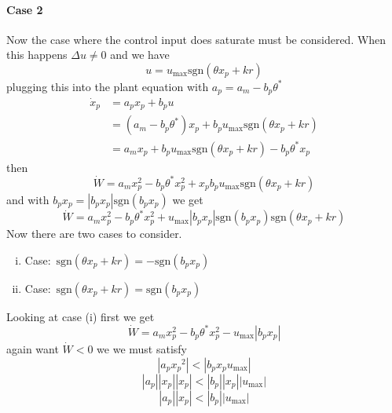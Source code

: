 \paragraph{Case 2} Now the case where the control input does saturate must be considered.
When this happens $\Delta u\neq 0$ and we have
\begin{equation*}
  u=u_{\text{max}}\text{sgn}(\theta x_{p}+kr)
\end{equation*}
plugging this into the plant equation with $a_{p}=a_{m}-b_{p}\theta^{*}$
\begin{equation*}
  \begin{split}
    \dot{x}_{p}&=a_{p}x_{p}+b_{p}u \\
    &=(a_{m}-b_{p}\theta^{*})x_{p}+b_{p}u_{\text{max}}\text{sgn}(\theta x_{p}+kr) \\
    &=a_{m}x_{p}+b_{p}u_{\text{max}}\text{sgn}(\theta x_{p}+kr)-b_{p}\theta^{*}x_{p}
  \end{split}
\end{equation*}
then
\begin{equation*}
  \dot{W}=a_{m}x_{p}^{2}-b_{p}\theta^{*}x_{p}^{2}+x_{p}b_{p}u_{\text{max}}\text{sgn}(\theta x_{p}+kr)
\end{equation*}
and with $b_{p}x_{p}=|b_{p}x_{p}|\text{sgn}(b_{p}x_{p})$ we get
\begin{equation*}
  \dot{W}=a_{m}x_{p}^{2}-b_{p}\theta^{*}x_{p}^{2}+u_{\text{max}}|b_{p}x_{p}|\text{sgn}(b_{p}x_{p})\text{sgn}(\theta x_{p}+kr)
\end{equation*}
Now there are two cases to consider.
\begin{enumerate}[(i)]
  \item{Case:\ $\text{sgn}(\theta x_{p}+kr)=-\text{sgn}(b_{p}x_{p})$}
  \item{Case:\ $\text{sgn}(\theta x_{p}+kr)=\text{sgn}(b_{p}x_{p})$}
\end{enumerate}
Looking at case (i) first we get
\begin{equation*}
  \dot{W}=a_{m}x_{p}^{2}-b_{p}\theta^{*}x_{p}^{2}-u_{\text{max}}|b_{p}x_{p}|
\end{equation*}
again want $\dot{W}<0$ we we must satisfy
\begin{equation*}
  |a_{p}x_{p}{}^{2}|<|b_{p}x_{p}u_{\text{max}}|
\end{equation*}
\begin{equation*}
  |a_{p}||x_{p}||x_{p}|<|b_{p}||x_{p}||u_{\text{max}}|
\end{equation*}
\begin{equation*}
  |a_{p}||x_{p}|<|b_{p}||u_{\text{max}}|
\end{equation*}
